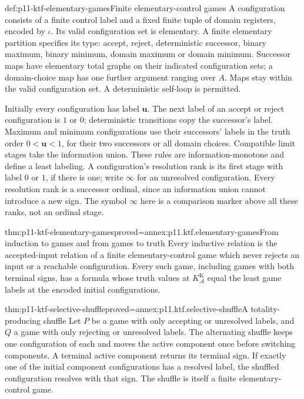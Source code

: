 \begin{hbdefinition}{def:p11-ktf-elementary-games}{Finite elementary-control games}
A configuration consists of a finite control label and a fixed finite
tuple of domain registers, encoded by \(\iota\). Its valid
configuration set is elementary. A finite elementary partition specifies
its type: accept, reject, deterministic successor, binary maximum,
binary minimum, domain maximum or domain minimum. Successor maps
have elementary total graphs on their indicated configuration sets;
a domain-choice map has one further argument ranging over \(A\).
Maps stay within the valid configuration set. A deterministic self-loop
is permitted.

Initially every configuration has label \(\mathbf u\).
The next label of an accept or reject configuration is \(1\)
or \(0\); deterministic transitions copy the successor's label.
Maximum and minimum configurations use their successors' labels
in the truth order \(0<\mathbf u<1\), for their two successors
or all domain choices. Compatible limit stages take the information
union. These rules are information-monotone and define a least
labeling. A configuration's resolution rank is its first stage with
label \(0\) or \(1\), if there is one; write \(\infty\)
for an unresolved configuration. Every resolution rank is a successor
ordinal, since an information union cannot introduce a new sign.
The symbol \(\infty\) here is a comparison marker above all these
ranks, not an ordinal stage.
\end{hbdefinition}

\begin{hblemma}{thm:p11-ktf-elementary-games}{proved=annex:p11.ktf.elementary-games}{From induction to games and from games to truth}
Every inductive relation is the accepted-input relation of a finite
elementary-control game which never rejects an input or a reachable
configuration. Every such game, including games with both terminal
signs, has a formula whose truth values at
\(K_{\mathcal A}^{\mathrm K}\) equal the least game labels
at the encoded initial configurations.
\end{hblemma}

\begin{hblemma}{thm:p11-ktf-selective-shuffle}{proved=annex:p11.ktf.selective-shuffle}{A totality-producing shuffle}
Let \(P\) be a game with only accepting or unresolved labels,
and \(Q\) a game with only rejecting or unresolved labels.
The alternating shuffle keeps one configuration of each and moves
the active component once before switching components. A terminal
active component returns its terminal sign. If exactly one of the
initial component configurations has a resolved label, the shuffled
configuration resolves with that sign. The shuffle is itself a finite
elementary-control game.
\end{hblemma}

